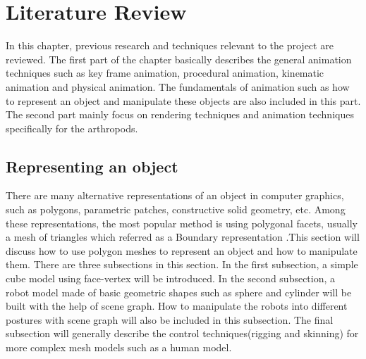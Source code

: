 \chapter{Literature Review}
In this chapter, previous research and techniques relevant to the
project are reviewed. The first part of the chapter basically describes
the general animation techniques such as key frame animation,
procedural animation, kinematic animation and physical animation. The
fundamentals of animation such as how to represent an object and
manipulate these objects are also included in this part. The second
part mainly focus on rendering techniques and animation techniques
specifically for the arthropods.
\section{Representing an object} 
There are many alternative representations of an object in computer graphics, such as polygons, parametric patches, constructive solid geometry, etc. Among these representations, the most popular method is using polygonal facets, usually a mesh of triangles which referred as a Boundary representation \cite{alan3D}.This section will discuss how to use polygon meshes to represent an object and how to manipulate them. There are three subsections in this section. In the first subsection, a simple cube model using face-vertex will be introduced. In the second subsection, a robot model made of basic geometric shapes such as sphere and cylinder will be built with the help of scene graph. How to manipulate the robots into different postures with scene graph will also be included in this subsection. The final subsection will generally describe the control techniques(rigging and skinning) for more complex mesh models such as a human model.
